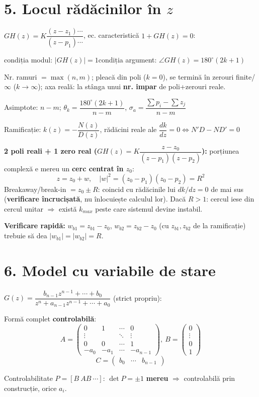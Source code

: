 \documentclass[8.2pt,a4paper,twocolumn]{extarticle}
\begin{document}
\section*{5. Locul rădăcinilor în $z$}
$GH(z)=K\dfrac{(z-z_1)\cdots}{(z-p_1)\cdots}$, ec. caracteristică $1+GH(z)=0$:
\begin{res}
condiția modul: $|GH(z)|=1$\qquad condiția argument: $\angle GH(z)=180^\circ(2k+1)$
\end{res}
Nr. ramuri $=\max(n,m)$; pleacă din poli ($k=0$), se termină în zerouri finite/$\infty$ ($k\to\infty$); axa reală: la stânga unui \textbf{nr. impar} de poli+zerouri reale.
\begin{res}
Asimptote: $n-m$; $\theta_k=\dfrac{180^\circ(2k+1)}{n-m}$, $\sigma_a=\dfrac{\sum p_i-\sum z_j}{n-m}$

Ramificație: $k(z)=-\dfrac{N(z)}{D(z)}$, rădăcini reale ale $\dfrac{dk}{dz}=0\Leftrightarrow N'D-ND'=0$
\end{res}
\begin{res}
\textbf{2 poli reali + 1 zero real ($GH(z)=K\dfrac{z-z_0}{(z-p_1)(z-p_2)}$):} porțiunea complexă e mereu un \textbf{cerc centrat în $z_0$}:
$$z=z_0+w,\quad |w|^2=(z_0-p_1)(z_0-p_2)=R^2$$
Breakaway/break-in $=z_0\pm R$: coincid cu rădăcinile lui $dk/dz=0$ de mai sus (\textbf{verificare încrucișată}, nu înlocuiește calculul lor). Dacă $R>1$: cercul iese din cercul unitar $\Rightarrow$ există $k_{max}$ peste care sistemul devine instabil.

\textbf{Verificare rapidă:} $w_{b1}=z_{b1}-z_0$, $w_{b2}=z_{b2}-z_0$ (cu $z_{b1},z_{b2}$ de la ramificație) trebuie să dea $|w_{b1}|=|w_{b2}|=R$.
\end{res}

\section*{6. Model cu variabile de stare}
$G(z)=\dfrac{b_{n-1}z^{n-1}+\cdots+b_0}{z^n+a_{n-1}z^{n-1}+\cdots+a_0}$ (strict propriu):
\begin{res}
Formă complet \textbf{controlabilă}:
$$A=\begin{pmatrix}0&1&\cdots&0\\\vdots&&\ddots&\vdots\\0&0&\cdots&1\\-a_0&-a_1&\cdots&-a_{n-1}\end{pmatrix}\!,\ B=\begin{pmatrix}0\\\vdots\\0\\1\end{pmatrix}$$
$$C=\begin{pmatrix}b_0&\cdots&b_{n-1}\end{pmatrix}$$
\end{res}
Controlabilitate $P=[B\ AB\ \cdots]$: $\det P=\pm1$ \textbf{mereu} $\Rightarrow$ controlabilă prin construcție, orice $a_i$.
\end{document}
